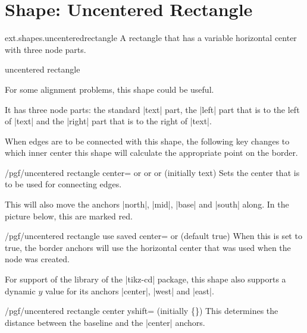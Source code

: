%
%
%

\section{Shape: Uncentered Rectangle}
\begin{purepgflibrary}{ext.shapes.uncenteredrectangle}
  A rectangle that has a variable horizontal center with three node parts.
\end{purepgflibrary}
\begin{shape}{uncentered rectangle}

For some alignment problems, this shape could be useful.

It has three node parts: the standard |text| part,
the |left| part that is to the left of |text|
and the |right| part that is to the right of |text|.

When edges are to be connected with this shape, the
following key changes to which inner center this shape will
calculate the appropriate point on the border.
\begin{key}{/pgf/uncentered rectangle center=\textrm{ or }\textrm{ or }\textrm{ or } (initially text)}
  Sets the center that is to be used for connecting edges.
  
  This will also move the anchors |north|, |mid|, |base| and |south| along.
  In the picture below, this are marked red.
\end{key}

\begin{key}{/pgf/uncentered rectangle use saved center=\textrm{ or } (default true)}
When this is set to true, the border anchors will use the horizontal center that was used when
the node was created.
\end{key}

For support of the  library of the |tikz-cd| package,
this shape also supports a dynamic $y$ value for its anchors |center|, |west| and |east|.
\begin{key}{/pgf/uncentered rectangle center yshift= (initially \{\})}
  This determines the distance between the baseline and the |center| anchors.
  

\end{key}
\end{shape}
